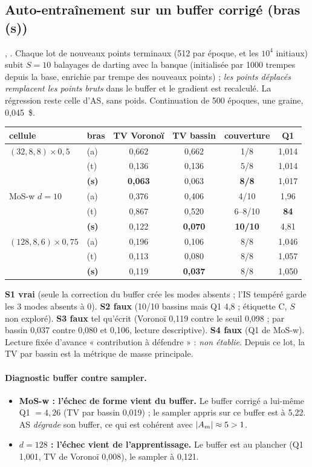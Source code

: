 \subsection{Auto-entraînement sur un buffer corrigé (bras (s))}
, . Chaque lot de nouveaux points terminaux (512 par époque, et les $10^4$ initiaux) subit $S=10$ balayages de darting avec la banque (initialisée par 1000 trempes depuis la base, enrichie par trempe des nouveaux points) ; \emph{les points déplacés remplacent les points bruts} dans le buffer et le gradient est recalculé. La régression reste celle d'AS, sans poids. Continuation de 500 époques, une graine, 0,045~\$.
\begin{table}[h]\centering\small
\begin{tabular}{llcccc}\toprule
cellule & bras & TV Voronoï & TV bassin & couverture & Q1\\\midrule
$(32,8,8)\times0{,}5$ & (a) & 0,662 & 0,662 & 1/8 & 1,014\\
 & (t) & 0,136 & 0,136 & 5/8 & 1,014\\
 & \textbf{(s)} & \textbf{0,063} & 0,063 & \textbf{8/8} & 1,017\\
MoS-w $d=10$ & (a) & 0,376 & 0,406 & 4/10 & 1,96\\
 & (t) & 0,867 & 0,520 & 6--8/10 & \textbf{84}\\
 & \textbf{(s)} & 0,122 & \textbf{0,070} & \textbf{10/10} & 4,81\\
$(128,8,6)\times0{,}75$ & (a) & 0,196 & 0,106 & 8/8 & 1,046\\
 & (t) & 0,113 & 0,080 & 8/8 & 1,057\\
 & \textbf{(s)} & 0,119 & \textbf{0,037} & 8/8 & 1,050\\\bottomrule
\end{tabular}
\end{table}
\begin{verdict}\textbf{S1 vrai} (seule la correction du buffer crée les modes absents ; l'IS tempéré garde les 3 modes absents à 0). \textbf{S2 faux} (10/10 bassins mais Q1 4,8 ; étiquette C, $S$ non exploré). \textbf{S3 faux} tel qu'écrit (Voronoï 0,119 contre le seuil 0,098 ; par bassin 0,037 contre 0,080 et 0,106, lecture descriptive). \textbf{S4 faux} (Q1 de MoS-w). Lecture fixée d'avance « contribution à défendre » : \emph{non établie}. Depuis ce lot, la TV par bassin est la métrique de masse principale.\end{verdict}

\paragraph{Diagnostic buffer contre sampler.}
\begin{itemize}
  \item \textbf{MoS-w : l'échec de forme vient du buffer.} Le buffer corrigé a lui-même Q1 $=4{,}26$ (TV par bassin 0,019) ; le sampler appris sur ce buffer est à 5,22. AS \emph{dégrade} son buffer, ce qui est cohérent avec $|A_m|\approx5>1$.
  \item \textbf{$d=128$ : l'échec vient de l'apprentissage.} Le buffer est au plancher (Q1 1,001, TV de Voronoï 0,008), le sampler à 0,121.
\end{itemize}
